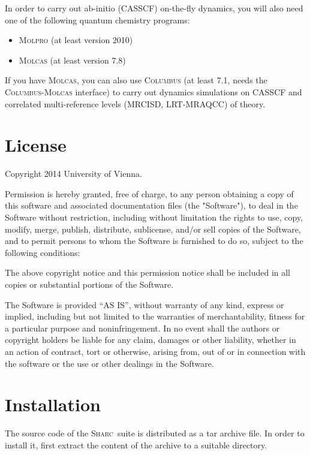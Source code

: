 \documentclass[a4paper,11pt,DIV=15,openany,twoside=false]{scrbook}
\newcommand{\sharc}{\textsc{Sharc}}
\newenvironment{example}{
  \vspace{0mm}
  \definecolor{shadecolor}{HTML}{BBDDFF}
  \begin{shaded}
  \begin{minipage}{0.9\textwidth}
}{
  \end{minipage}
  \end{shaded}
}
\begin{document}
In order to carry out ab-initio (CASSCF) on-the-fly dynamics, you will also need one of the following quantum chemistry programs:
\begin{itemize}
  \item \textsc{Molpro} (at least version 2010)
  \item \textsc{Molcas} (at least version 7.8)
\end{itemize}
If you have \textsc{Molcas}, you can also use \textsc{Columbus} (at least 7.1, needs the \textsc{Columbus}-\textsc{Molcas} interface) to carry out dynamics simulations on CASSCF and correlated multi-reference levels (MRCISD, LRT-MRAQCC) of theory.

\section{License}

\begin{example}
Copyright 2014 University of Vienna.

\medskip

Permission is hereby granted, free of charge, to any person obtaining a copy
of this software and associated documentation files (the "Software"), to deal
in the Software without restriction, including without limitation the rights
to use, copy, modify, merge, publish, distribute, sublicense, and/or sell
copies of the Software, and to permit persons to whom the Software is
furnished to do so, subject to the following conditions:

The above copyright notice and this permission notice shall be included in
all copies or substantial portions of the Software.

The Software is provided ``AS IS'', without warranty of any kind, express or
implied, including but not limited to the warranties of merchantability,
fitness for a particular purpose and noninfringement. In no event shall the
authors or copyright holders be liable for any claim, damages or other
liability, whether in an action of contract, tort or otherwise, arising from,
out of or in connection with the software or the use or other dealings in
the Software.
\end{example}

\section{Installation}

The source code of the  \sharc\ suite is distributed as a tar archive file. In order to install it, first extract the content of the archive to a suitable directory.
\end{document}
